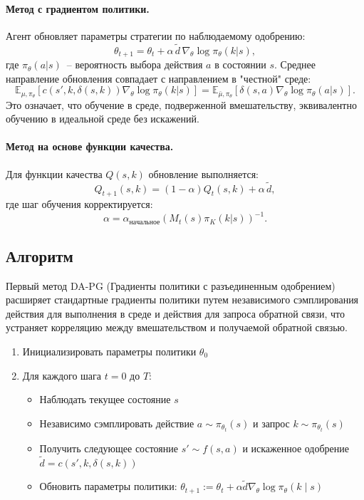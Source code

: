 \paragraph{Метод с градиентом политики.} Агент обновляет параметры стратегии по наблюдаемому одобрению:
\begin{equation}
\theta_{t+1} = \theta_t + \alpha\, \tilde{d}\, \nabla_\theta \log \pi_\theta(k|s),
\end{equation}
где $\pi_\theta(a|s)$~-- вероятность выбора действия $a$ в состоянии $s$.
Среднее направление обновления совпадает с направлением в "честной" среде:
\begin{equation}
\mathbb{E}_{\mu,\pi_\theta}[c(s',k,\delta(s,k))\nabla_\theta \log \pi_\theta(k|s)] =
\mathbb{E}_{\bar{\mu},\pi_\theta}[\delta(s,a)\nabla_\theta \log \pi_\theta(a|s)].
\end{equation}
Это означает, что обучение в среде, подверженной вмешательству, эквивалентно обучению в идеальной среде без искажений.

\paragraph{Метод на основе функции качества.} Для функции качества $Q(s,k)$ обновление выполняется:
\begin{equation}
Q_{t+1}(s,k) = (1 - \alpha) Q_t(s,k) + \alpha\, \tilde{d},
\end{equation}
где шаг обучения корректируется:
\begin{equation}
\alpha = \alpha_{начальное}(M_t(s)\pi_K(k|s))^{-1}.
\end{equation}

\subsection{Алгоритм}

Первый метод DA-PG (Градиенты политики с разъединенным одобрением) расширяет стандартные градиенты политики путем независимого сэмплирования действия для выполнения в среде и действия для запроса обратной связи, что устраняет корреляцию между вмешательством и получаемой обратной связью.

\begin{enumerate}
    \item Инициализировать параметры политики $\theta_0$
    \item Для каждого шага $t = 0$ до $T$:
    \begin{itemize}
        \item Наблюдать текущее состояние $s$
        \item Независимо сэмплировать действие $a \sim \pi_{\theta_t}(s)$ и запрос $k \sim \pi_{\theta_t}(s)$
        \item Получить следующее состояние $s' \sim f(s,a)$ и искаженное одобрение $\tilde{d} = c(s',k,\delta(s,k))$
        \item Обновить параметры политики: $\theta_{t+1} := \theta_t + \alpha\tilde{d}\nabla_\theta \log \pi_\theta(k \mid s)$
    \end{itemize}
\end{enumerate}

